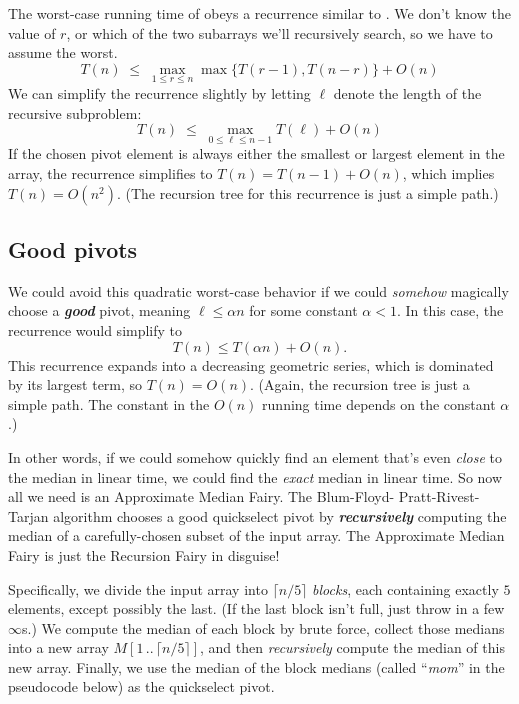 The worst-case running time of  obeys a recurrence similar to . We don’t know the value of $r$, or which of the two subarrays we’ll recursively search, so we have to assume the worst.
\[
T(n) \;\le\; \max_{1 \le r \le n} \max\{T(r-1), T(n-r)\} + O(n)
\]
We can simplify the recurrence slightly by letting $\ell$ denote the length of the recursive subproblem:
\[
T(n) \;\le\; \max_{0 \le \ell \le n-1} T(\ell) + O(n)
\]
If the chosen pivot element is always either the smallest or largest element in the array, the recurrence simplifies to $T(n) = T(n - 1) + O(n)$, which implies $T(n) = O(n^2)$. (The recursion tree for this recurrence is just a simple path.)

\subsection{Good pivots}
We could avoid this quadratic worst-case behavior if we could \emph{somehow} magically choose a \textbf{\textit{good}} pivot, meaning $\ell \le \alpha n$ for some constant $\alpha < 1$. In this case, the recurrence would simplify to
\[
T(n) \le T(\alpha n) + O(n).
\]
This recurrence expands into a decreasing geometric series, which is dominated by its largest term, so $T(n) = O(n)$. (Again, the recursion tree is just a simple path. The constant in the $O(n)$ running time depends on the constant $\alpha$.)

In other words, if we could somehow quickly find an element that’s even \emph{close} to the median in linear time, we could find the \emph{exact} median in linear time. So now all we need is an Approximate Median Fairy. The Blum-Floyd- Pratt-Rivest-Tarjan algorithm chooses a good quickselect pivot by \textbf{\textit{recursively}} computing the median of a carefully-chosen subset of the input array. The Approximate Median Fairy is just the Recursion Fairy in disguise!

Specifically, we divide the input array into $\lceil n/5\rceil$ \emph{blocks}, each containing exactly $5$ elements, except possibly the last. (If the last block isn’t full, just throw in a few $\infty$s.) We compute the median of each block by brute force, collect those medians into a new array $M[1\,..\,\lceil n/5\rceil]$, and then \emph{recursively} compute the median of this new array. Finally, we use the median of the block medians (called “\emph{mom}” in the pseudocode below) as the quickselect pivot.

